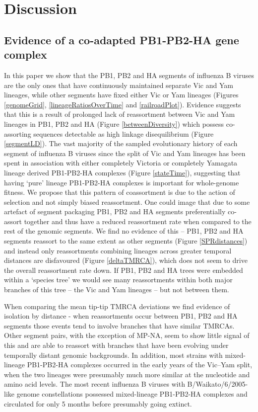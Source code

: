 \documentclass[11pt,oneside,letterpaper]{article}
\begin{document}
\section*{Discussion}

\subsection*{Evidence of a co-adapted PB1-PB2-HA gene complex}
In this paper we show that the PB1, PB2 and HA segments of influenza B viruses are the only ones that have continuously maintained separate Vic and Yam lineages, while other segments have fixed either Vic or Yam lineages (Figures \ref{genomeGrid}, \ref{lineageRatiosOverTime} and \ref{railroadPlot}).
Evidence suggests that this is a result of prolonged lack of reassortment between Vic and Yam lineages in PB1, PB2 and HA (Figure \ref{betweenDiversity}) which possess co-assorting sequences detectable as high linkage disequilibrium (Figure \ref{segmentLD}).
The vast majority of the sampled evolutionary history of each segment of influenza B viruses since the split of Vic and Yam lineages has been spent in association with either completely Victoria or completely Yamagata lineage derived PB1-PB2-HA complexes (Figure \ref{stateTime}), suggesting that having `pure' lineage PB1-PB2-HA complexes is important for whole-genome fitness.
We propose that this pattern of coassortment is due to the action of selection and not simply biased reassortment.
One could image that due to some artefact of segment packaging PB1, PB2 and HA segments preferentially co-assort together and thus have a reduced reassortment rate when compared to the rest of the genomic segments.
We find no evidence of this -- PB1, PB2 and HA segments reassort to the same extent as other segments (Figure \ref{SPRdistances}) and instead only reassortments combining lineages across greater temporal distances are disfavoured (Figure \ref{deltaTMRCA}), which does not seem to drive the overall reassortment rate down.
If PB1, PB2 and HA trees were embedded within a `species tree' we would see many reassortments within both major branches of this tree -- the Vic and Yam lineages -- but not between them.

When comparing the mean tip-tip TMRCA deviations we find evidence of isolation by distance - when reassortments occur between PB1, PB2 and HA segments those events tend to involve branches that have similar TMRCAs.
Other segment pairs, with the exception of MP-NA, seem to show little signal of this and are able to reassort with branches that have been evolving under temporally distant genomic backgrounds.
In addition, most strains with mixed-lineage PB1-PB2-HA complexes occurred in the early years of the Vic--Yam split, when the two lineages were presumably much more similar at the nucleotide and amino acid levels.
The most recent influenza B viruses with B/Waikato/6/2005-like genome constellations possessed mixed-lineage PB1-PB2-HA complexes and circulated for only 5 months before presumably going extinct.
\end{document}

